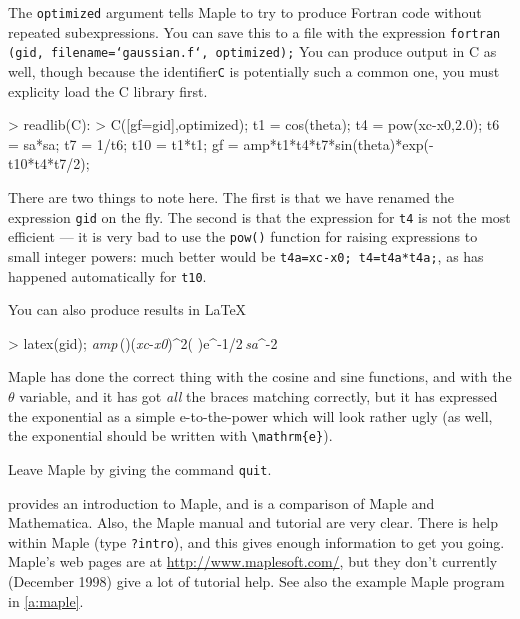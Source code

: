 \documentclass[11pt,oneside,chapters]{starlink}
\begin{document}
The \texttt{optimized} argument tells Maple to try to
produce Fortran code without repeated subexpressions.  You
can save this to a file with the expression
\texttt{fortran (gid, filename=`gaussian.f`, optimized);} You can
produce output in C as well, though because the
identifier\texttt{C} is potentially such a common one,
you must explicity load the C library first.

\begin{terminalv}
> readlib(C):
> C([gf=gid],optimized);
      t1 = cos(theta);
      t4 = pow(xc-x0,2.0);
      t6 = sa*sa;
      t7 = 1/t6;
      t10 = t1*t1;
      gf = amp*t1*t4*t7*sin(theta)*exp(-t10*t4*t7/2);
\end{terminalv}

There are two things to note here.  The first is that we
have renamed the expression \texttt{gid} on the fly.
The second is that the expression for \texttt{t4} is not
the most efficient --- it is very bad to use the
\texttt{pow()} function for raising expressions to small
integer powers: much better would be \texttt{t4a=xc-x0; t4=t4a*t4a;},
as has happened automatically for
\texttt{t10}.

You can also produce results in LaTeX

\begin{terminalv}
> latex(gid);
{\it amp}\,\cos(\theta)\left ({\it xc}-{\it x0}\right )^{2}\sin(\theta
){e^{-1/2\,{}}}{{\it sa}}^{-2}
\end{terminalv}

Maple has done the correct thing with the cosine and sine
functions, and with the $\theta$
variable, and it has got \emph{all} the braces matching
correctly, but it has expressed the exponential as a simple
e-to-the-power which will look rather ugly (as well, the
exponential should be written with \texttt{\textbackslash{}mathrm\{e\}}).

Leave Maple by giving the command \texttt{quit}.

 provides an
introduction to Maple, and
 is a comparison of Maple and Mathematica.
Also, the Maple manual and tutorial are very clear.  There
is help within Maple (type \texttt{?intro}), and this
gives enough information to get you going.  Maple's web
pages are at \url{http://www.maplesoft.com/}, but they
don't currently (December 1998) give a lot of tutorial help.
See also the example Maple program in \ref{a:maple}.
\end{document}
